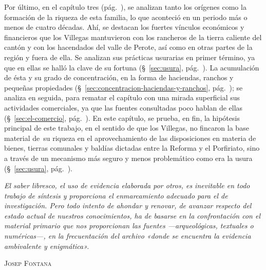 \documentclass[14pt,twoside,final]{extbook} %
\begin{document}
Por último, en el capítulo tres (pág.~\pageref{ch:capitulo-tres}), se analizan tanto los orígenes como la formación de la riqueza de esta familia, lo que aconteció en un periodo más o menos de cuatro décadas. Ahí, se destacan los fuertes vínculos económicos y financieros que los Villegas mantuvieron con los rancheros de la tierra caliente del cantón y con los hacendados del valle de Perote, así como en otras partes de la región y fuera de ella. Se analizan sus prácticas usurarias en primer término, ya que en ellas se halló la clave de su fortuna (\S~\ref{sec:usura}, pág.~\pageref{sec:usura}). La acumulación de ésta y su grado de concentración, en la forma de haciendas, ranchos y pequeñas propiedades (\S~\ref{sec:concentracion-haciendas-y-ranchos}, pág.~\pageref{sec:concentracion-haciendas-y-ranchos}); se analiza en seguida, para rematar el capítulo con una mirada superficial sus actividades comerciales, ya que las fuentes consultadas poco hablan de ellas (\S~\ref{sec:el-comercio}, pág.~\pageref{sec:el-comercio}). En este capítulo, se prueba, en fin, la hipótesis principal de este trabajo, en el sentido de que los Villegas, no fincaron la base material de~su riqueza en el aprovechamiento de las disposiciones en materia de bienes, tierras comunales y baldías dictadas entre la Reforma y el Porfiriato, sino a través de un mecanismo más seguro y menos problemático como era la usura (\S~\ref{sec:usura}, pág.~\pageref{sec:usura}).
\newpage
\pagestyle{empty}
\null\vfill
\newpage
\pagestyle{empty}
\begin{flushright}
\begin{minipage}{8cm}
\emph{El saber libresco, el uso de evidencia elaborada por otros, es inevitable en todo trabajo de síntesis y proporciona el enmarcamiento adecuado para el de investigación. Pero todo intento de ahondar y renovar, de avanzar respecto del estado actual de nuestros conocimientos, ha de basarse en la confrontación con el material primario que nos proporcionan las fuentes ---arqueológicas, textuales o numéricas---, en la frecuentación del archivo «donde se encuentra la evidencia ambivalente y enigmática».}
\end{minipage}
\end{flushright}
\begin{flushright}
\textsc{Josep Fontana}
\end{flushright}
\end{document}
